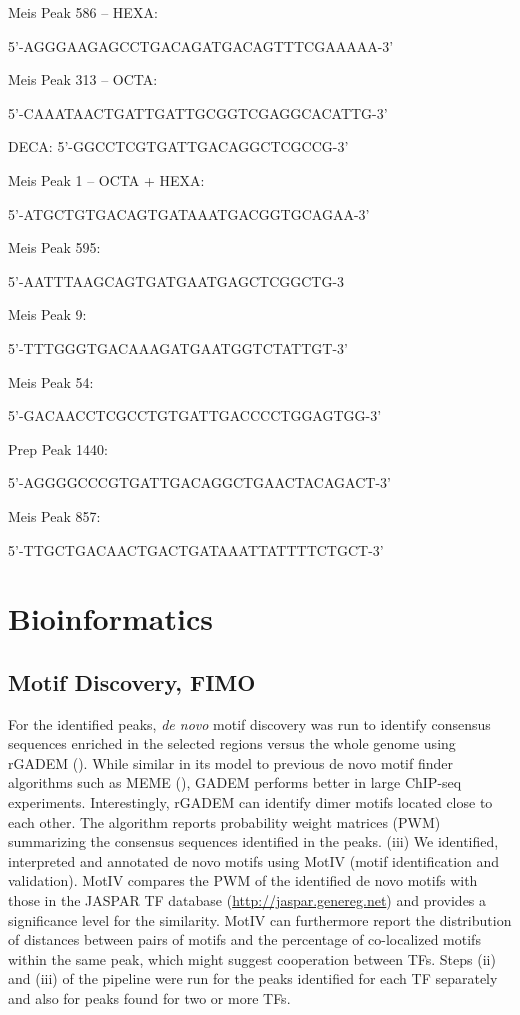 Meis Peak 586 -- HEXA:

5’-AGGGAAGAGCCTGACAGATGACAGTTTCGAAAAA-3’ 

Meis Peak 313 -- OCTA:

5’-CAAATAACTGATTGATTGCGGTCGAGGCACATTG-3’ 

DECA:
5’-GGCCTCGTGATTGACAGGCTCGCCG-3’

Meis Peak 1 -- OCTA + HEXA:

5’-ATGCTGTGACAGTGATAAATGACGGTGCAGAA-3’ 

Meis Peak 595:

5’-AATTTAAGCAGTGATGAATGAGCTCGGCTG-3

Meis Peak 9:

5’-TTTGGGTGACAAAGATGAATGGTCTATTGT-3’

Meis Peak 54:

5’-GACAACCTCGCCTGTGATTGACCCCTGGAGTGG-3’ 

Prep Peak 1440:

5’-AGGGGCCCGTGATTGACAGGCTGAACTACAGACT-3’ 

Meis Peak 857:

5’-TTGCTGACAACTGACTGATAAATTATTTTCTGCT-3’ 



\section{Bioinformatics}

\subsection{Motif Discovery, FIMO}

For the identified peaks, \textit{de novo} motif discovery was run to identify consensus sequences enriched in the selected regions versus the whole genome using rGADEM (\cite{Li2009a}). While similar in its model to previous de novo motif finder algorithms such as MEME (\cite{Bailey2006}), GADEM performs better in large ChIP-seq experiments. Interestingly, rGADEM can identify dimer motifs located close to each other. The algorithm reports probability weight matrices (PWM) summarizing the consensus sequences identified in the peaks. (iii) We identified, interpreted and annotated de novo motifs using MotIV (motif identification and validation). MotIV compares the PWM of the identified de novo motifs with those in the JASPAR TF database (\url{http://jaspar.genereg.net}) and provides a significance level for the similarity. MotIV can furthermore report the distribution of distances between pairs of motifs and the percentage of co-localized motifs within the same peak, which might suggest cooperation between TFs. Steps (ii) and (iii) of the pipeline were run for the peaks identified for each TF separately and also for peaks found for two or more TFs. 

